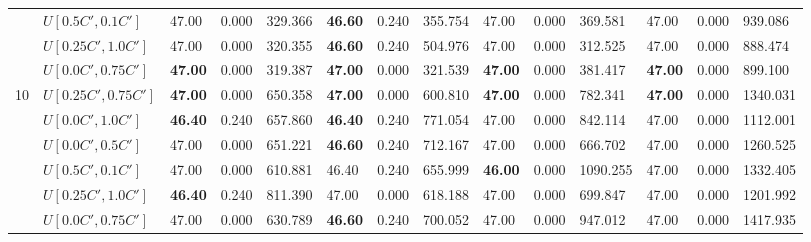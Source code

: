 \begin{table}[h]
{\begin{tabular}{|l|l||l|l|l||l|l|l||l|l|l||l|l|l|}
       & $U[0.5C',0.1C']$ & 47.00 & 0.000 & 329.366 & \textbf{46.60} & 0.240 & 355.754 				& 47.00 & 0.000 & 369.581 & 47.00 & 0.000 & 939.086\\
       & $U[0.25C',1.0C']$ & 47.00 & 0.000 & 320.355 & \textbf{46.60} & 0.240 & 504.976 				& 47.00 & 0.000 & 312.525 & 47.00 & 0.000 & 888.474\\
       & $U[0.0C',0.75C']$ & \textbf{47.00} & 0.000 & 319.387 & \textbf{47.00} & 0.000 & 321.539 	& \textbf{47.00} & 0.000 & 381.417 & \textbf{47.00} & 0.000 & 899.100\\
      \hline\hline
      \multirow{6}{*}{10}
       & $U[0.25C',0.75C']$ & \textbf{47.00} & 0.000 & 650.358 & \textbf{47.00} & 0.000 & 600.810 	& \textbf{47.00} & 0.000 & 782.341 & \textbf{47.00} & 0.000 & 1340.031\\
       & $U[0.0C',1.0C']$ & \textbf{46.40} & 0.240 & 657.860 & \textbf{46.40} & 0.240 & 771.054		& 47.00 & 0.000 & 842.114 & 47.00 & 0.000 & 1112.001\\
       & $U[0.0C',0.5C']$ & 47.00 & 0.000 & 651.221 & \textbf{46.60} & 0.240 & 712.167 				& 47.00 & 0.000 & 666.702 & 47.00 & 0.000 & 1260.525\\
       & $U[0.5C',0.1C']$ & 47.00 & 0.000 & 610.881 & 46.40 & 0.240 & 655.999 						& \textbf{46.00} & 0.000 & 1090.255 & 47.00 & 0.000 & 1332.405\\
       & $U[0.25C',1.0C']$ & \textbf{46.40} & 0.240 & 811.390 & 47.00 & 0.000 & 618.188 				& 47.00 & 0.000 & 699.847 & 47.00 & 0.000 & 1201.992\\
       & $U[0.0C',0.75C']$ & 47.00 & 0.000 & 630.789 & \textbf{46.60} & 0.240 & 700.052 				& 47.00 & 0.000 & 947.012 & 47.00 & 0.000 & 1417.935\\
      \hline
      \end{tabular}
      }
      \label{tab:in2}
      \end{table}


